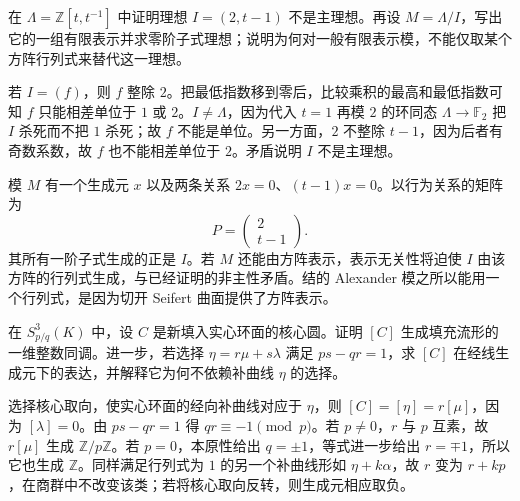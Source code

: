 \begin{exercise}\label{g2:ex:alexander-nonprincipal-ring}
	在 \(\Lambda=\mathbb Z[t,t^{-1}]\) 中证明理想 \(I=(2,t-1)\) 不是主理想。再设 \(M=\Lambda/I\)，写出它的一组有限表示并求零阶子式理想；说明为何对一般有限表示模，不能仅取某个方阵行列式来替代这一理想。
\end{exercise}
\begin{solution}
	若 \(I=(f)\)，则 \(f\) 整除 \(2\)。把最低指数移到零后，比较乘积的最高和最低指数可知 \(f\) 只能相差单位于 \(1\) 或 \(2\)。\(I\ne\Lambda\)，因为代入 \(t=1\) 再模 \(2\) 的环同态 \(\Lambda\to\mathbb F_2\) 把 \(I\) 杀死而不把 \(1\) 杀死；故 \(f\) 不能是单位。另一方面，\(2\) 不整除 \(t-1\)，因为后者有奇数系数，故 \(f\) 也不能相差单位于 \(2\)。矛盾说明 \(I\) 不是主理想。

	模 \(M\) 有一个生成元 \(x\) 以及两条关系 \(2x=0\)、\((t-1)x=0\)。以行为关系的矩阵为
	\[
		P=\begin{pmatrix}2\\t-1\end{pmatrix}.
	\]
	其所有一阶子式生成的正是 \(I\)。若 \(M\) 还能由方阵表示，表示无关性将迫使 \(I\) 由该方阵的行列式生成，与已经证明的非主性矛盾。结的 Alexander 模之所以能用一个行列式，是因为切开 Seifert 曲面提供了方阵表示。
\end{solution}

\begin{exercise}\label{g2:ex:filling-core-generator}
	在 \(S^3_{p/q}(K)\) 中，设 \(C\) 是新填入实心环面的核心圆。证明 \([C]\) 生成填充流形的一维整数同调。进一步，若选择 \(\eta=r\mu+s\lambda\) 满足 \(ps-qr=1\)，求 \([C]\) 在经线生成元下的表达，并解释它为何不依赖补曲线 \(\eta\) 的选择。
\end{exercise}
\begin{solution}
	选择核心取向，使实心环面的经向补曲线对应于 \(\eta\)，则 \([C]=[\eta]=r[\mu]\)，因为 \([\lambda]=0\)。由 \(ps-qr=1\) 得 \(qr\equiv-1\pmod p\)。若 \(p\ne0\)，\(r\) 与 \(p\) 互素，故 \(r[\mu]\) 生成 \(\mathbb Z/p\mathbb Z\)。若 \(p=0\)，本原性给出 \(q=\pm1\)，等式进一步给出 \(r=\mp1\)，所以它也生成 \(\mathbb Z\)。同样满足行列式为 \(1\) 的另一个补曲线形如 \(\eta+k\alpha\)，故 \(r\) 变为 \(r+kp\)，在商群中不改变该类；若将核心取向反转，则生成元相应取负。
\end{solution}

